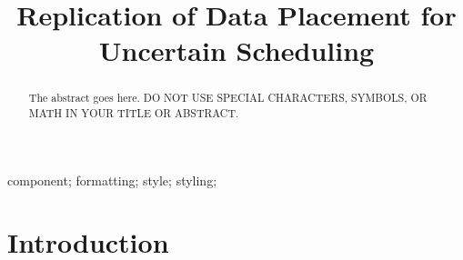 \documentclass[10pt, conference, compsocconf]{IEEEtran}
\begin{document}
%
\title{Replication of Data Placement for Uncertain Scheduling}



\author{

}





\maketitle


\begin{abstract}
The abstract goes here. DO NOT USE SPECIAL CHARACTERS, SYMBOLS, OR MATH IN YOUR TITLE OR ABSTRACT.

\end{abstract}

\begin{IEEEkeywords}
component; formatting; style; styling;

\end{IEEEkeywords}


%
\IEEEpeerreviewmaketitle

\section{Introduction}
\end{document}
